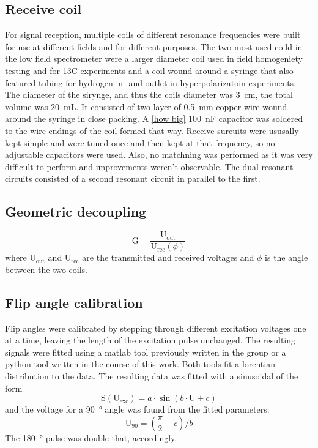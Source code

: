        \subsection{Receive coil}
        For signal reception, multiple coils of different resonance frequencies were built for use at different fields and for different purposes. The two most used coild in the low field spectrometer were a larger diameter coil used in field homogeniety testing and for 13C experiments and a coil wound around a syringe that also featured tubing for hydrogen in- and outlet in hyperpolarizatoin experiments. The diameter of the sirynge, and thus the coils diameter was \SI{3}{\cm}, the total volume was \SI{20}{\milli\liter}. It consisted of two layer of \SI{0.5}{\milli\meter} copper wire wound around the syringe in close packing. A \ref{how big} \SI{100}{\nano\farad} capacitor was soldered to the wire endings of the coil formed that way. 
        Receive surcuits were ususally kept simple and were tuned once and then kept at that frequency, so no adjustable capacitors were used. Also, no matchning was performed as it was very difficult to perform and improvements weren't observable. The dual resonant circuits consisted of a second resonant circuit in parallel to the first.
        \subsection{Geometric decoupling}
            \begin{equation}
            \mathrm{G}=\frac{\mathrm{U_{out}}}{\mathrm{U_{rec}}(\phi)}
            \end{equation}
            where $\mathrm{U_{out}}$ and $\mathrm{U_{rec}}$ are the transmitted and received voltages and $\phi$ is the angle between the two coils.
        \subsection{Flip angle calibration}
            Flip angles were calibrated by stepping through different excitation voltages one at a time, leaving the length of the excitation pulse unchanged. The resulting signals were fitted using a matlab tool previously written in the group or a python tool written in the course of this work. Both tools fit a lorentian distribution to the data.
            The resulting data was fitted with a sinusoidal of the form
            \begin{equation}
                \mathrm{S}(\mathrm{U_{exc}})= a \cdot \sin(b\cdot \mathrm{U} + c)
            \end{equation}
            and the voltage for a  \SI{90}{\degree} angle was found from the fitted parameters:
            \begin{equation}
                \mathrm{U}_{90} = (\frac{\pi}{2}-c)/b
            \end{equation}
            The \SI{180}{\degree} pulse was double that, accordingly.

